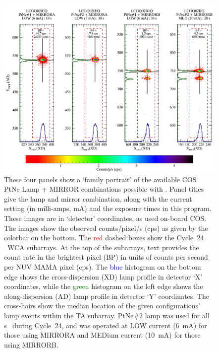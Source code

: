 \begin{figure}[htb]
\vspace{1.3cm}
\centering
\includegraphics[width=\textwidth]{png/C21_13526_FP.png}
\caption{These four panels show a `family portrait' of the available COS PtNe Lamp + MIRROR combinations possible with . Panel titles give the lamp and mirror combination, along with the current setting (in milli-amps, mA) and the exposure times in this program.
These images are in `detector' coordinates, as used on-board COS.
The images show the observed counts/pixel/s (cps) as given by the colorbar on the bottom.
The \textcolor{red}{red} dashed boxes show the Cycle~24 ~WCA subarrays. At the top of the subarrays, text provides the count rate in the brightest pixel (BP) in units of counts per second per NUV MAMA pixel (cps).
The \textcolor{blue}{blue} histogram on the bottom edge shows the cross-dispersion (XD) lamp profile in detector `X' coordinates, while
the \textcolor{green}{green} histogram on the left edge shows the along-dispersion (AD) lamp profile in detector `Y' coordinates.
The cross-hairs show the median location of the given configurations' lamp events within the TA subarray.
PtNe\#2 lamp was used for all s~ during Cycle~24, and was operated at LOW current (6~mA) for those using MIRRORA and MEDium current (10~mA) for those using MIRRORB.
}
\label{fig:FP}
\vspace{1.3cm}
\end{figure}

